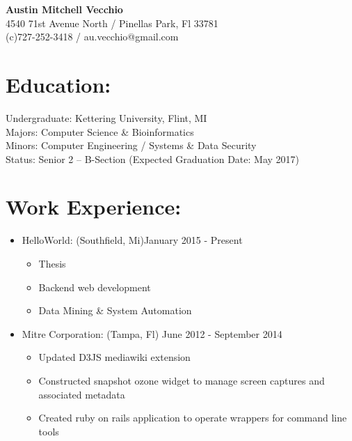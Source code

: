\documentclass{res}
\begin{document}
\begin{center}
\LARGE{\textbf{Austin Mitchell Vecchio}}\\
\normalsize{
4540 71st Avenue North / Pinellas Park, Fl 33781\\
(c)727-252-3418 / au.vecchio@gmail.com
}
\end{center}

\section{Education:}
Undergraduate: Kettering University, Flint, MI\\
Majors: Computer Science \& Bioinformatics\\
Minors: Computer Engineering / Systems \& Data Security\\
Status: Senior 2 – B-Section (Expected Graduation Date: May 2017)

\section{Work Experience:}
\begin{itemize}[leftmargin=*]
\item HelloWorld: (Southfield, Mi)\hfill January 2015 - Present
\begin{itemize}[label=$\circ$]
\item Thesis
\item Backend web development
\item Data Mining \& System Automation
\end{itemize}
\item Mitre Corporation: (Tampa, Fl) \hfill June 2012 - September 2014
\begin{itemize}[label=$\circ$]
\item Updated D3JS mediawiki extension
\item Constructed snapshot ozone widget to manage screen captures and associated metadata
\item Created ruby on rails application to operate wrappers for command line tools
\end{itemize}
\end{itemize}
\end{document}
